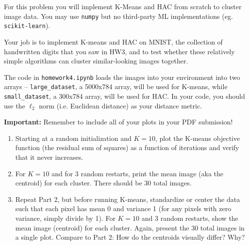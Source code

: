 \documentclass[submit]{harvardml}
\begin{document}
\begin{problem}

For this problem you will implement K-Means and HAC from scratch to cluster image data. You may use \texttt{numpy} but no third-party ML implementations (eg. \texttt{scikit-learn}).

Your job is to implement K-means and HAC on MNIST, the collection of handwritten digits that you saw in HW3, and to test whether these relatively
simple algorithms can cluster similar-looking images together.

The code in \texttt{homework4.ipynb} loads the images into your environment into two arrays -- \texttt{large\_dataset}, a 5000x784 array, will be used for K-means, while \texttt{small\_dataset}, a 300x784 array, will be used for HAC. In your code, you should use the $\ell_2$ norm (i.e. Euclidean distance) as your distance metric.

\textbf{Important:} Remember to include all of your plots in your PDF submission!


\begin{enumerate}

\item Starting at a random initialization and $K = 10$, plot the
  K-means objective function (the residual sum of squares) as a
  function of iterations and verify that it never increases.

\item For $K=10$ and for 3 random restarts, print the mean image (aka
  the centroid) for each cluster. There should be 30 total images.

\item Repeat Part 2, but before running K-means, standardize or center
  the data such that each pixel has mean 0 and variance 1 (for any
  pixels with zero variance, simply divide by 1). For $K=10$ and 3
  random restarts, show the mean image (centroid) for each
  cluster. Again, present the 30 total images in a single
  plot. Compare to Part 2: How do the centroids visually differ? Why?


\end{enumerate}
\end{problem}
\end{document}
